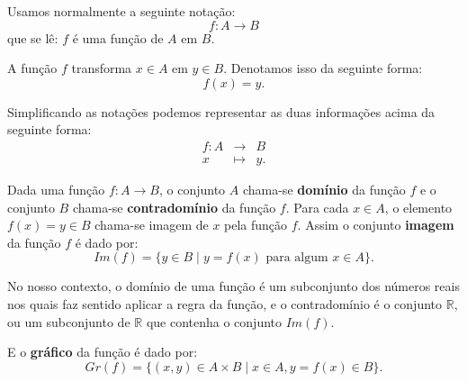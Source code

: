 \newpage

Usamos normalmente a seguinte notação:
\[f: A \rightarrow B\]
que se lê: $f$ é uma função de $A$ em $B$.

A função $f$ transforma $x \in A$ em $y \in B$. Denotamos isso da seguinte forma:
\[f(x) = y .\]

Simplificando as notações podemos representar as duas informações acima da seguinte forma:
\begin{eqnarray*}
 f: A & \rightarrow & B \\
 x & \mapsto & y.
\end{eqnarray*}

Dada uma função $f: A \rightarrow B$, o conjunto $A$ chama-se \textbf{domínio} da função $f$ e o conjunto $B$ chama-se \textbf{contradomínio} da função $f$.  Para cada $x \in A$, o elemento $f(x)= y \in B$ chama-se imagem de $x$ pela função $f$. Assim o conjunto \textbf{imagem} da função $f$ é dado por:
\[Im(f)= \{ y \in B \mid y = f(x) \text{ para algum } x \in A\} .\]

No nosso contexto, o domínio de uma função é um subconjunto dos números reais nos quais faz sentido aplicar a regra da função, e o contradomínio é o conjunto $\mathbb{R}$, ou um subconjunto de $\mathbb{R}$ que contenha o conjunto $Im(f)$.

E o \textbf{gráfico} da função é dado por:
\[Gr(f) = \{ (x, y) \in A \times B \mid x \in A, y = f(x) \in B\} .\]

